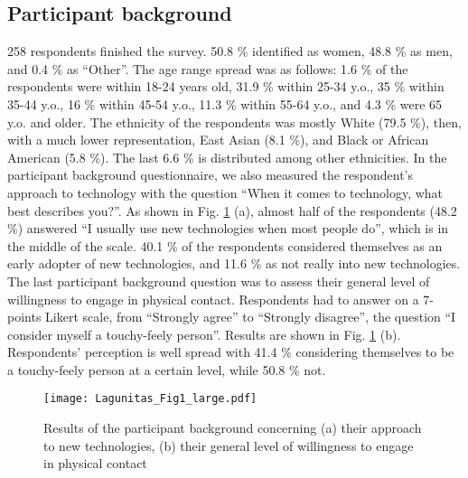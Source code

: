 \documentclass[acmsmall]{acmart}
\begin{document}
\subsection{Participant background}
258 respondents finished the survey. 50.8 \% identified as women, 48.8 \% as men, and 0.4 \% as ``Other”. The age range spread was as follows: 1.6 \% of the respondents were within 18-24 years old, 31.9 \% within 25-34 y.o., 35 \% within 35-44 y.o., 16 \% within 45-54 y.o., 11.3 \% within 55-64 y.o., and 4.3 \% were 65 y.o. and older. The ethnicity of the respondents was mostly White (79.5 \%), then, with a much lower representation, East Asian (8.1 \%), and Black or African American (5.8 \%). The last 6.6 \% is distributed among other ethnicities. In the participant background questionnaire, we also measured the respondent’s approach to technology with the question “When it comes to technology, what best describes you?”. As shown in Fig. \ref{fig_partBackground} (a), almost half of the respondents (48.2 \%) answered “I usually use new technologies when most people do”, which is in the middle of the scale. 40.1 \% of the respondents considered themselves as an early adopter of new technologies, and 11.6 \% as not really into new technologies. The last participant background question was to assess their general level of willingness to engage in physical contact. Respondents had to answer on a 7-points Likert scale, from “Strongly agree” to “Strongly disagree”, the question “I consider myself a touchy-feely person”. Results are shown in Fig. \ref{fig_partBackground} (b). Respondents' perception is well spread with 41.4 \% considering themselves to be a touchy-feely person at a certain level, while 50.8 \% not.

\begin{figure}[!t]
	\centering
	\texttt{[image: Lagunitas\_Fig1\_large.pdf]}
	\caption{Results of the participant background concerning (a) their approach to new technologies, (b) their general level of willingness to engage in physical contact}
	\label{fig_partBackground}
\end{figure}
\end{document}
